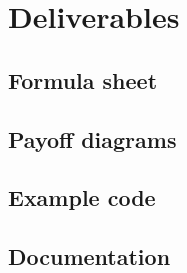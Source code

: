 \chapter{Deliverables}



\section{Formula sheet}
\section{Payoff diagrams}
\section{Example code}
\section{Documentation}